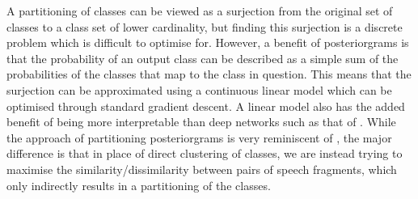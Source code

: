 A partitioning of classes can be viewed as a surjection from the original set of classes to a class set of lower cardinality, but finding this surjection is a discrete problem which is difficult to optimise for.
However, a benefit of posteriorgrams is that the probability of an output class can be described as a simple sum of the probabilities of the classes that map to the class in question.
This means that the surjection can be approximated using a continuous linear model which can be optimised through standard gradient descent.
A linear model also has the added benefit of being more interpretable than deep networks such as that of \textcite{thiolliere2015hybrid}.
While the approach of partitioning posteriorgrams is very reminiscent of \textcite{jansen2013weak}, the major difference is that in place of direct clustering of classes, we are instead trying to maximise the similarity/dissimilarity between pairs of speech fragments, which only indirectly results in a partitioning of the classes.


